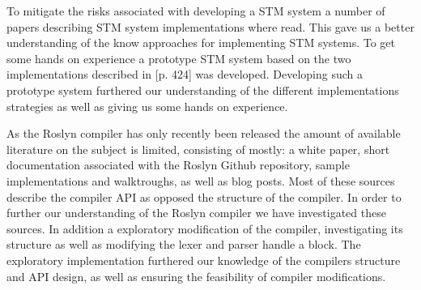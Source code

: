 To mitigate the risks associated with developing a \ac{STM} system a number of papers describing \ac{STM} system implementations where read. This gave us a better understanding of the know approaches for implementing \ac{STM} systems. To get some hands on experience a prototype \ac{STM} system based on the two implementations described in \cite{herlihy2012art}[p. 424] was developed. Developing such a prototype system furthered our understanding of the different implementations strategies as well as giving us some hands on experience.

As the Roslyn compiler has only recently been released the amount of available literature on the subject is limited, consisting of mostly: a white paper\cite{ng2012roslyn}, short documentation associated with the Roslyn Github repository\cite{roslynwiki}, sample implementations and walktroughs\cite{roslynsamples}, as well as blog posts. Most of these sources describe the compiler \acs{API} as opposed the structure of the compiler. In order to further our understanding of the Roslyn compiler we have investigated these sources. In addition a exploratory modification of the compiler, investigating its structure as well as modifying the lexer and parser handle a  block. The exploratory implementation furthered our knowledge of the compilers structure and \ac{API} design, as well as ensuring the feasibility of compiler modifications.


\worksheetend